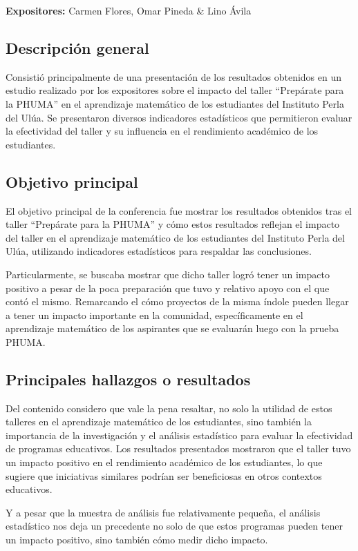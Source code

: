 \documentclass[11pt]{article}
\begin{document}
    \textbf{Expositores:} Carmen Flores, Omar Pineda \& Lino Ávila

    \subsection{Descripción general}
    Consistió principalmente de una presentación de los resultados obtenidos en un estudio realizado por los expositores sobre el impacto del taller ``Prepárate para la PHUMA'' en el aprendizaje matemático de los estudiantes del Instituto Perla del Ulúa. Se presentaron diversos indicadores estadísticos que permitieron evaluar la efectividad del taller y su influencia en el rendimiento académico de los estudiantes.

    \subsection{Objetivo principal}
    El objetivo principal de la conferencia fue mostrar los resultados obtenidos tras el taller ``Prepárate para la PHUMA'' y cómo estos resultados reflejan el impacto del taller en el aprendizaje matemático de los estudiantes del Instituto Perla del Ulúa, utilizando indicadores estadísticos para respaldar las conclusiones.

    Particularmente, se buscaba mostrar que dicho taller logró tener un impacto positivo a pesar de la poca preparación que tuvo y relativo apoyo con el que contó el mismo. Remarcando el cómo proyectos de la misma índole pueden llegar a tener un impacto importante en la comunidad, específicamente en el aprendizaje matemático de los aspirantes que se evaluarán luego con la prueba PHUMA.\@

    \subsection{Principales hallazgos o resultados}
    Del contenido considero que vale la pena resaltar, no solo la utilidad de estos talleres en el aprendizaje matemático de los estudiantes, sino también la importancia de la investigación y el análisis estadístico para evaluar la efectividad de programas educativos. Los resultados presentados mostraron que el taller tuvo un impacto positivo en el rendimiento académico de los estudiantes, lo que sugiere que iniciativas similares podrían ser beneficiosas en otros contextos educativos.

    Y a pesar que la muestra de análisis fue relativamente pequeña, el análisis estadístico nos deja un precedente no solo de que estos programas pueden tener un impacto positivo, sino también cómo medir dicho impacto.
\end{document}
